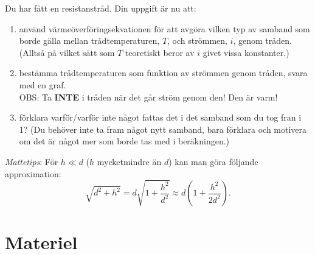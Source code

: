 \documentclass[12pt,a4paper]{article}
\begin{document}
Du har fått en resistanstråd. Din uppgift är nu att:
\begin{enumerate}
\item använd värmeöverföringsekvationen för att avgöra vilken typ av
  samband som borde gälla mellan trådtemperaturen, $T$, och strömmen, $i$, genom
  tråden. (Alltså på vilket sätt som $T$ teoretiskt beror av $i$ givet
  vissa konstanter.)
\item bestämma trådtemperaturen som funktion av strömmen genom
  tråden, svara med en graf. \\ 
\large
OBS: Ta \textbf{INTE} i tråden när det går ström genom den! Den är 
varm!
\normalsize 
\item förklara varför/varför inte något fattas det i det samband som
  du tog fran i 1? (Du behöver inte ta fram något nytt samband, bara
  förklara och motivera om det är något mer som borde tas med i
  beräkningen.) 

\end{enumerate}




\emph{Mattetips}: För $h\ll d$ ($h$ mycket\footnotemark mindre än $d$)
kan man göra följande  approximation:
\[ \sqrt{d^2+h^2} = d\sqrt{1+\frac{h^2}{d^2}} 
\approx d\left( 1+\frac{h^2}{2d^2}\right). \]

\section*{Materiel}

\end{document}
